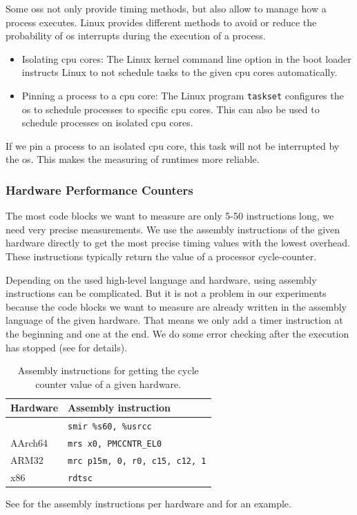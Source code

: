 Some \acp{os} not only provide timing methods, but also allow to manage how a process executes.
Linux provides different methods to avoid or reduce the probability of \ac{os} interrupts during the execution of a process.
\begin{itemize}
    \item Isolating \ac{cpu} cores: 
    The Linux kernel command line option \mbox{} in the boot loader instructs Linux to not schedule tasks to the given \ac{cpu} cores automatically.
    \item Pinning a process to a \ac{cpu} core: 
    The Linux program \lstinline|taskset| configures the \ac{os} to schedule processes to specific \ac{cpu} cores.
    This can also be used to schedule processes on isolated \ac{cpu} cores.
\end{itemize}
If we pin a process to an isolated \ac{cpu} core, this task will not be interrupted by the \ac{os}.
This makes the measuring of runtimes more reliable.

\subsubsection{Hardware Performance Counters}
\label{sec:approach:hwpercounter}
The most code blocks we want to measure are only 5-50 instructions long, \ie we need very precise measurements.
We use the assembly instructions of the given hardware directly to get the most precise timing values with the lowest overhead.
These instructions typically return the value of a processor cycle-counter.

Depending on the used high-level language and hardware, using assembly instructions can be complicated.
But it is not a problem in our experiments because the code blocks we want to measure are already written in the assembly language of the given hardware.
That means we only add a timer instruction at the beginning and one at the end.
We do some error checking after the execution has stopped (see  for details).
\begin{table}
    \centering
    \begin{tabular}{@{}ll@{}}
        \toprule
        Hardware & Assembly instruction \\
        \midrule
        \auroralong{} & \lstinline|smir %s60, %usrcc| \\
        AArch64 & \lstinline|mrs x0, PMCCNTR_EL0| \\
        ARM32 & \lstinline|mrc p15m, 0, r0, c15, c12, 1| \\
        x86 & \lstinline|rdtsc| \\
        \bottomrule
    \end{tabular}
    \caption[Assembly Instructions for Getting the Cycle Counter Value of a Given Hardware]{Assembly instructions for getting the cycle counter value of a given hardware.}
    \label{tab:approach:asm_instrs_timing}
\end{table}
See  for the assembly instructions per hardware and  for an example.

